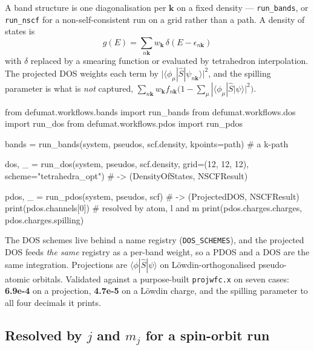 \documentclass[11pt,a4paper]{article}
\newcommand{\code}[1]{\texttt{\small #1}}
\begin{document}
A band structure is one diagonalisation per $\mathbf k$ on a fixed density ---
\code{run\_bands}, or \code{run\_nscf} for a non-self-consistent run on a grid
rather than a path. A density of states is
\begin{equation*}
g(E) = \sum_{n\mathbf k} w_{\mathbf k}\,\delta(E - \epsilon_{n\mathbf k})
\end{equation*}
with $\delta$ replaced by a smearing function or evaluated by tetrahedron
interpolation. The projected DOS weights each term by
$\big|\langle\phi_\mu|\hat S|\psi_{n\mathbf k}\rangle\big|^2$, and the spilling
parameter is what is \emph{not} captured,
$\sum_{n\mathbf k} w_{\mathbf k} f_{n\mathbf k}\big(1-\sum_\mu|\langle\phi_\mu|\hat S|\psi\rangle|^2\big)$.

\begin{pycode}
from defumat.workflows.bands import run_bands
from defumat.workflows.dos import run_dos
from defumat.workflows.pdos import run_pdos

bands = run_bands(system, pseudos, scf.density, kpoints=path)   # a k-path

dos, _ = run_dos(system, pseudos, scf.density, grid=(12, 12, 12),
                 scheme="tetrahedra_opt")     # -> (DensityOfStates, NSCFResult)

pdos, _ = run_pdos(system, pseudos, scf)      # -> (ProjectedDOS, NSCFResult)
print(pdos.channels[0])                       # resolved by atom, l and m
print(pdos.charges.charges, pdos.charges.spilling)
\end{pycode}

The DOS schemes live behind a name registry (\code{DOS\_SCHEMES}), and the
projected DOS feeds \emph{the same} registry as a per-band weight, so a PDOS and
a DOS are the same integration. Projections are
$\langle\phi|\hat S|\psi\rangle$ on Löwdin-orthogonalised pseudo-atomic
orbitals. Validated against a purpose-built \code{projwfc.x} on seven cases:
\textbf{6.9e-4} on a projection, \textbf{4.7e-5} on a Löwdin charge, and the
spilling parameter to all four decimals it prints.

\subsection*{Resolved by $j$ and $m_j$ for a spin-orbit run}
\end{document}
